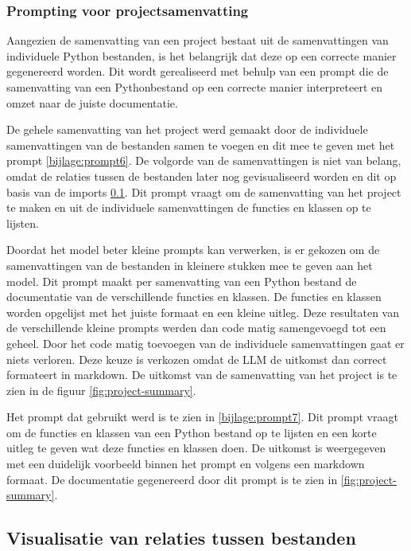 \subsubsection{Prompting voor projectsamenvatting}
\label{sec:project-documentatie-prompting}

Aangezien de samenvatting van een project bestaat uit de samenvattingen van individuele Python bestanden, is het belangrijk dat deze op een correcte manier gegenereerd worden.
Dit wordt gerealiseerd met behulp van een prompt die de samenvatting van een Pythonbestand op een correcte manier interpreteert en omzet naar de juiste documentatie.

De gehele samenvatting van het project werd gemaakt door de individuele samenvattingen van de bestanden samen te voegen en dit mee te geven met het prompt \ref{bijlage:prompt6}.
De volgorde van de samenvattingen is niet van belang, omdat de relaties tussen de bestanden later nog gevisualiseerd worden en dit op basis van de imports \ref{sec:project-documentatie-relaties}.
Dit prompt vraagt om de samenvatting van het project te maken en uit de individuele samenvattingen de functies en klassen op te lijsten.

Doordat het model beter kleine prompts kan verwerken, is er gekozen om de samenvattingen van de bestanden in kleinere stukken mee te geven aan het model.
Dit prompt maakt per samenvatting van een Python bestand de documentatie van de verschillende functies en klassen. 
De functies en klassen worden opgelijst met het juiste formaat en een kleine uitleg.
Deze resultaten van de verschillende kleine prompts werden dan code matig samengevoegd tot een geheel. 
Door het code matig toevoegen van de individuele samenvattingen gaat er niets verloren. 
Deze keuze is verkozen omdat de LLM de uitkomst dan correct formateert in markdown.  
De uitkomst van de samenvatting van het project is te zien in de figuur \ref{fig:project-summary}.

Het prompt dat gebruikt werd is te zien in \ref{bijlage:prompt7}.
Dit prompt vraagt om de functies en klassen van een Python bestand op te lijsten en een korte uitleg te geven wat deze functies en klassen doen.
De uitkomst is weergegeven met een duidelijk voorbeeld binnen het prompt en volgens een markdown formaat. 
De documentatie gegenereerd door dit prompt is te zien in \ref{fig:project-summary}.

\subsection{Visualisatie van relaties tussen bestanden}
\label{sec:project-documentatie-relaties}

